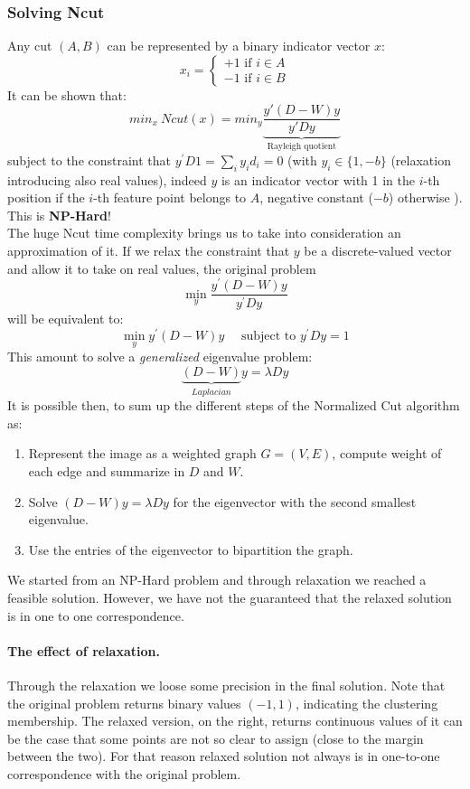 \subsubsection{Solving Ncut} 
Any cut $(A,B)$ can be represented by a binary indicator vector $x$:
$$x_i = \begin{cases}
+1 \text{  if } i \in A\\
-1 \text{  if } i \in B
\end{cases}$$
It can be shown that:
$$min_x ~ Ncut(x) = min_y \underbrace{\frac{y'(D-W)y}{y'Dy}}_{\text{Rayleigh quotient}}$$
subject to the constraint that $y ^ { \prime } D1 = \sum_{i} y_{i} d _ { i } = 0$ (with $y _ { i } \in \{ 1 , - b \}$ (relaxation introducing also real values), indeed $y$ is an indicator vector with 1 in the $i$-th position if the $i$-th feature point belongs to $A$, negative constant ($-b$) otherwise ). This is \textbf{NP-Hard}!\\
The huge Ncut time complexity brings us to take into consideration an approximation of it. If we relax the constraint that $y$ be a discrete-valued vector and allow it to take on real values, the original problem
$$\min _ { y } \frac { y ^ { \prime } ( D - W ) y } { y ^ { \prime } D y }$$
will be equivalent to:
$$\min _ { y } y ^ { \prime } ( D - W ) y \quad \text { subject to } y ^ { \prime } D y = 1$$
This amount to solve a \textit{generalized} eigenvalue problem:
$$\underbrace{(D-W)}_{Laplacian}y=\lambda D y$$
It is possible then, to sum up the different steps of the Normalized Cut algorithm as:
\begin{enumerate}
	\item Represent the image as a weighted graph $G = (V,E)$, compute weight of each edge and summarize in $D$ and $W$.
	\item Solve $(D-W)y = \lambda Dy$ for the eigenvector with the second smallest eigenvalue.
	\item Use the entries of the eigenvector to bipartition the graph.
\end{enumerate}
We started from an NP-Hard problem and through relaxation we reached a feasible solution. However, we have not the guaranteed that the relaxed solution is in one to one correspondence.

\paragraph*{The effect of relaxation.} Through the relaxation we loose some precision in the final solution. 
Note that the original problem returns binary values $(-1,1)$, indicating the clustering membership. The relaxed version, on the right, returns continuous values of it can be the case that some points are not so clear to assign (close to the margin between the two). For that reason relaxed solution not always is in one-to-one correspondence with the original problem.

